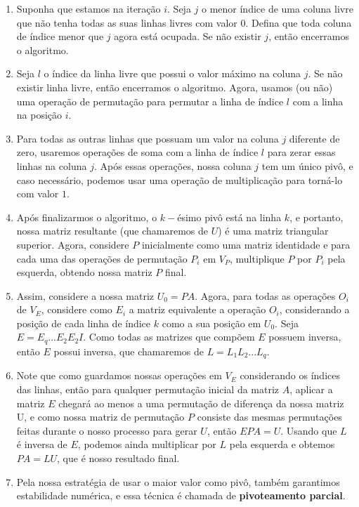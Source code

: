 \documentclass[11pt, a4paper]{article}
\begin{document}
\begin{enumerate}
    \item Suponha que estamos na iteração \(i\). Seja \(j\) o menor índice de uma coluna livre que não tenha todas as suas linhas livres com valor 0. Defina que toda coluna de índice menor que \(j\) agora está ocupada. Se não existir \(j\), então encerramos o algoritmo.
    \void[0.2]
    \item Seja \(l\) o índice da linha livre que possui o valor máximo na coluna \(j\). Se não existir linha livre, então encerramos o algoritmo. Agora, usamos (ou não) uma operação de permutação para permutar a linha de índice \(l\) com a linha na posição \(i\).
    \void[0.2]
    \item Para todas as outras linhas que possuam um valor na coluna \(j\) diferente de zero, usaremos operações de soma com a linha de índice \(l\) para zerar essas linhas na coluna \(j\). Após essas operações, nossa coluna \(j\) tem um único pivô, e caso necessário, podemos usar uma operação de multiplicação para torná-lo com valor \(1\).
    \void[0.2]
    \item Após finalizarmos o algoritmo, o \(k-\)ésimo pivô está na linha \(k\), e portanto, nossa matriz resultante (que chamaremos de \(U\)) é uma matriz triangular superior. Agora, considere \(P\) inicialmente como uma matriz identidade e para cada uma das operações de permutação \(P_i\) em \(V_P\), multiplique \(P\) por \(P_i\) pela esquerda, obtendo nossa matriz \(P\) final.
    \void[0.2]
    \item Assim, considere a nossa matriz \(U_0=PA\). Agora, para todas as operações \(O_i\) de \(V_E\), considere como \(E_i\) a matriz equivalente a operação \(O_i\), considerando a posição de cada linha de índice \(k\) como a sua posição em \(U_0\). Seja \(E=E_q...E_2E_2I\). Como todas as matrizes que compõem \(E\) possuem inversa, então \(E\) possui inversa, que chamaremos de \(L=L_1L_2...L_q\).
    \void[0.2]
    \item Note que como guardamos nossas operações em \(V_E\) considerando os índices das linhas, então para qualquer permutação inicial da matriz \(A\), aplicar a matriz \(E\) chegará ao menos a uma permutação de diferença da nossa matriz U, e como nossa matriz de permutação \(P\) consiste das mesmas permutações feitas durante o nosso processo para gerar \(U\), então \(EPA=U\). Usando que \(L\) é inversa de \(E\), podemos ainda multiplicar por \(L\) pela esquerda e obtemos \(PA=LU\), que é nosso resultado final.
    \void[0.2]
    \item Pela nossa estratégia de usar o maior valor como pivô, também garantimos estabilidade numérica, e essa técnica é chamada de \textbf{pivoteamento parcial}.
    \void[0.2]
\end{enumerate}
\end{document}
